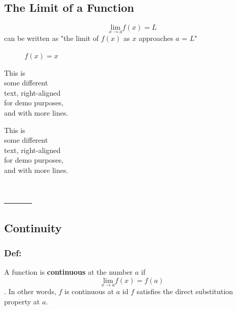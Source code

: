 \documentclass[11pt]{article}
\theoremstyle{plain}
\theoremstyle{definition}
\begin{document}
\subsection{The Limit of a Function}
 
 
$$\underset{x \rightarrow a}{\text{lim}}f(x)=L$$ can be written as "the limit of $f(x)$ as $x$ approaches $a$ = $L$"


\begin{minipage}[t]{.3\textwidth}

\begin{figure}
\pgfplotsset{compat=1.6,width=5cm,height=5cm}
 
\caption{$f(x)=x$}
\end{figure}

\end{minipage}%
\begin{minipage}[t]{.3\textwidth}
This is \\
some different \\
text, right-aligned \\
for demo purposes, \\
and with more lines.
\end{minipage}%
\begin{minipage}[t]{.3\textwidth}
This is \\
some different \\
text, right-aligned \\
for demo purposes, \\
and with more lines.
\end{minipage}

 \subsection{___}
 
\subsection{Continuity}
\subsubsection{Def:} A function is \textbf{continuous} at the number $a$ if $$\underset{x \rightarrow a}{\text{lim}}f(x)=f(a)$$. In other words, $f$ is continuous at $a$ id $f$ satisfies the direct substitution property at $a$.
\end{document}
